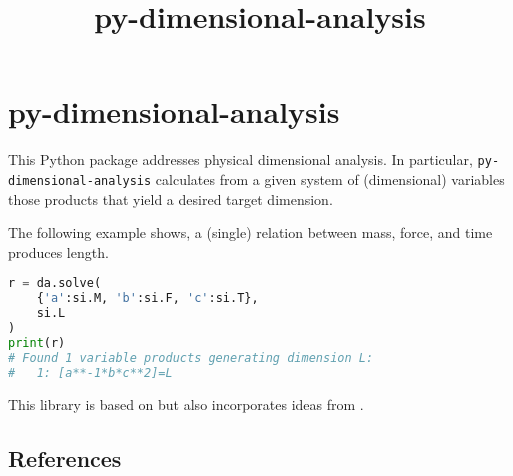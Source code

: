 \documentclass[11pt]{article}
\title{py-dimensional-analysis}
\date{}
\begin{document}
\maketitle

\section{py-dimensional-analysis}
This Python package addresses physical dimensional analysis. In particular, \texttt{py-dimensional-analysis} calculates from a given system of (dimensional) variables those products that yield a desired target dimension.


The following example shows, a (single) relation between mass, force, and time produces length.

\begin{lstlisting}[language=Python]
r = da.solve(
    {'a':si.M, 'b':si.F, 'c':si.T}, 
    si.L
)
print(r)
# Found 1 variable products generating dimension L:
#   1: [a**-1*b*c**2]=L
\end{lstlisting}

This library is based on \cite{szirtes2007applied} but also incorporates ideas from \cite{santiago2019first, sonin2001dimensional}.

\subsection{References}

\begingroup
\renewcommand{\section}[2]{}%

\endgroup
\end{document}
